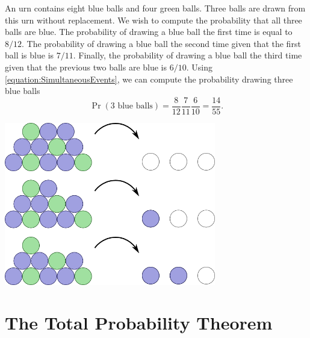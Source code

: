 \begin{example}
An urn contains eight blue balls and four green balls.
Three balls are drawn from this urn without replacement.
We wish to compute the probability that all three balls are blue.
The probability of drawing a blue ball the first time is equal to $8/12$.
The probability of drawing a blue ball the second time given that the first ball is blue is $7/11$.
Finally, the probability of drawing a blue ball the third time given that the previous two balls are blue is $6/10$.
Using \eqref{equation:SimultaneousEvents}, we can compute the probability drawing three blue balls
\begin{equation*}
\Pr (\text{3 blue balls})
= \frac{8}{12} \frac{7}{11} \frac{6}{10}
= \frac{14}{55} .
\end{equation*}

\begin{center}
\includegraphics[height=7.11cm]{Figures/3Chapter/balls}
\end{center}
\end{example}


\section{The Total Probability Theorem}

